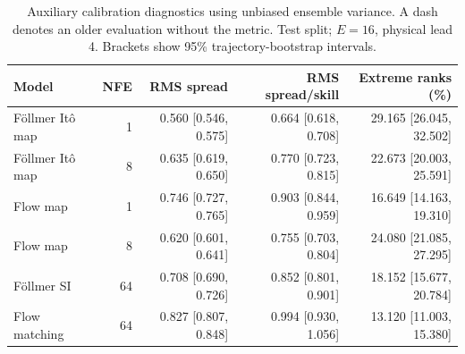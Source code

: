\begin{table}[t]
\centering
\small
\setlength{\tabcolsep}{3pt}
\caption{Auxiliary calibration diagnostics using unbiased ensemble variance. A dash denotes an older evaluation without the metric. Test split; $E=16$, physical lead 4. Brackets show 95\% trajectory-bootstrap intervals.}
\label{tab:map-rms-calibration}
\begin{tabular}{lrrrr}
\toprule
Model & NFE & RMS spread & RMS spread/skill & Extreme ranks (\%) \\
\midrule
Föllmer Itô map & 1 & 0.560 [0.546, 0.575] & 0.664 [0.618, 0.708] & 29.165 [26.045, 32.502] \\
Föllmer Itô map & 8 & 0.635 [0.619, 0.650] & 0.770 [0.723, 0.815] & 22.673 [20.003, 25.591] \\
\addlinespace
Flow map & 1 & 0.746 [0.727, 0.765] & 0.903 [0.844, 0.959] & 16.649 [14.163, 19.310] \\
Flow map & 8 & 0.620 [0.601, 0.641] & 0.755 [0.703, 0.804] & 24.080 [21.085, 27.295] \\
\addlinespace
Föllmer SI & 64 & 0.708 [0.690, 0.726] & 0.852 [0.801, 0.901] & 18.152 [15.677, 20.784] \\
\addlinespace
Flow matching & 64 & 0.827 [0.807, 0.848] & 0.994 [0.930, 1.056] & 13.120 [11.003, 15.380] \\
\bottomrule
\end{tabular}
\end{table}

